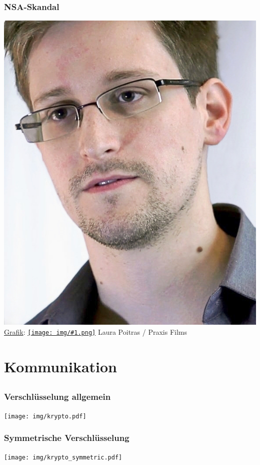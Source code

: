 \documentclass[12pt]{beamer}
\newcommand{\cc}[1]{\texttt{[image: img/\#1.png]}\hspace{1mm}}
\begin{document}
\begin{frame}
    \frametitle{NSA-Skandal}
    \includegraphics[height=0.7\textheight]{img/snowden.jpg}
    \\{\small \href{https://commons.wikimedia.org/wiki/File:Edward_Snowden.jpg\#mediaviewer/File:Edward_Snowden-2.jpg}{Grafik}: \href{https://creativecommons.org/licenses/by/3.0/}{\cc{by}} Laura Poitras / Praxis Films}
\end{frame}

\section{Kommunikation}
\subsection{}
\begin{frame}
    \frametitle{Verschlüsselung allgemein}
    \texttt{[image: img/krypto.pdf]}
\end{frame}

\begin{frame}
    \frametitle{Symmetrische Verschlüsselung}
    \texttt{[image: img/krypto\_symmetric.pdf]}
\end{frame}
\end{document}
